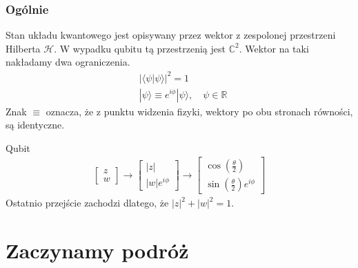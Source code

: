 \documentclass[10pt,t]{beamer}
\begin{document}
\begin{frame}
  \frametitle{Ogólnie}


  Stan układu kwantowego jest opisywany przez wektor z zespolonej
  przestrzeni Hilberta $\mathcal{H}$. W wypadku qubitu tą przestrzenią jest
  $\mathbb{C}^{ 2 }$. Wektor na taki nakładamy dwa ograniczenia.
  \begin{align*}
    &| \langle \psi | \psi \rangle |^{ 2 } = 1 \\
    &| \psi \rangle \equiv e^{ i \phi } | \psi \rangle, \quad \psi \in \mathbb{R}
  \end{align*}
  Znak $\equiv$ oznacza, że z punktu widzenia fizyki, wektory po obu stronach
  równości, są identyczne.

  Qubit
  \begin{align*}
    \begin{bmatrix}
      z \\
      w
    \end{bmatrix}
    \to
    \begin{bmatrix}
      | z | \\
      | w | e^{ i \phi }
    \end{bmatrix}
    \to
    \begin{bmatrix}
      \cos( \frac{ \theta }{ 2 } ) \\
      \sin( \frac{ \theta }{ 2 } ) e^{ i \phi }
    \end{bmatrix}
  \end{align*}
  Ostatnio przejście zachodzi dlatego, że $| z |^{ 2 } + | w |^{ 2 } = 1$.

\end{frame}





\section{Zaczynamy podróż}
\end{document}
